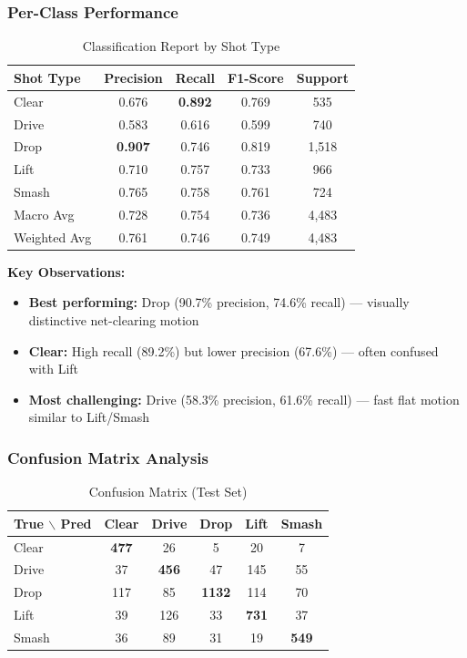 \documentclass[12pt,a4paper]{article}
\begin{document}
\subsubsection{Per-Class Performance}

\begin{table}[H]
\centering
\caption{Classification Report by Shot Type}
\begin{tabular}{lcccc}
\toprule
Shot Type & Precision & Recall & F1-Score & Support \\
\midrule
Clear & 0.676 & \textbf{0.892} & 0.769 & 535 \\
Drive & 0.583 & 0.616 & 0.599 & 740 \\
Drop & \textbf{0.907} & 0.746 & 0.819 & 1,518 \\
Lift & 0.710 & 0.757 & 0.733 & 966 \\
Smash & 0.765 & 0.758 & 0.761 & 724 \\
\midrule
Macro Avg & 0.728 & 0.754 & 0.736 & 4,483 \\
Weighted Avg & 0.761 & 0.746 & 0.749 & 4,483 \\
\bottomrule
\end{tabular}
\end{table}

\textbf{Key Observations:}
\begin{itemize}
\item \textbf{Best performing:} Drop (90.7\% precision, 74.6\% recall) --- visually distinctive net-clearing motion
\item \textbf{Clear:} High recall (89.2\%) but lower precision (67.6\%) --- often confused with Lift
\item \textbf{Most challenging:} Drive (58.3\% precision, 61.6\% recall) --- fast flat motion similar to Lift/Smash
\end{itemize}

\subsubsection{Confusion Matrix Analysis}

\begin{table}[H]
\centering
\caption{Confusion Matrix (Test Set)}
\begin{tabular}{l|ccccc}
\toprule
True $\backslash$ Pred & Clear & Drive & Drop & Lift & Smash \\
\midrule
Clear & \textbf{477} & 26 & 5 & 20 & 7 \\
Drive & 37 & \textbf{456} & 47 & 145 & 55 \\
Drop & 117 & 85 & \textbf{1132} & 114 & 70 \\
Lift & 39 & 126 & 33 & \textbf{731} & 37 \\
Smash & 36 & 89 & 31 & 19 & \textbf{549} \\
\bottomrule
\end{tabular}
\end{table}
\end{document}

